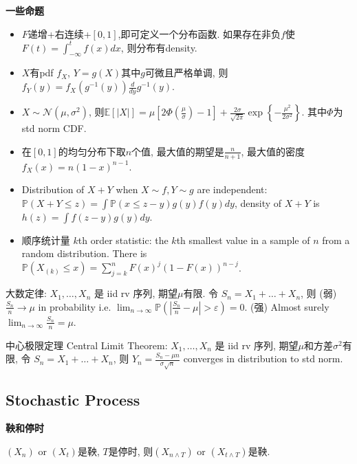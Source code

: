 \documentclass[UTF8]{ctexart}
\begin{document}
\noindent \textbf{一些命题}
\begin{itemize}

	\item $F$递增+右连续+$[0,1]$,即可定义一个分布函数.
	      如果存在非负$f$使$F(t)=\int_{-\infty}^t f(x)dx$, 则分布有density.

	\item $X$有pdf $f_X$, $Y=g(X)$其中$g$可微且严格单调, 则$f_Y(y)=f_X(g^{-1}(y))\frac{d}{dy}g^{-1}(y)$.

	\item $X\sim \mathcal{N}(\mu,\sigma^2)$,
	      则$\mathbb{E}[|X|]=\mu\left[2 \Phi\left(\frac{\mu}{\sigma}\right)-1\right]+
		      \frac{2 \sigma}{\sqrt{2 \pi}} \exp \left\{-\frac{\mu^{2}}{2 \sigma^{2}}\right\}$.
	      其中$\Phi$为std norm CDF.

	\item 在$[0,1]$的均匀分布下取$n$个值, 最大值的期望是$\frac{n}{n+1}$, 最大值的密度
	      $f_X(x) = n(1-x)^{n-1}$.

	\item Distribution of $X+Y$ when $X\sim f,Y\sim g$ are independent:
	      $\mathbb{P} (X+Y\leq z)=\int\mathbb{P}(x\leq z-y)g(y)f(y)dy$,
	      density of $X+Y$ is $h(z)=\int f(z-y)g(y)dy$.

	\item 顺序统计量 $k$th order statistic: the $k$th smallest value in a sample of $n$ from a random distribution.
	      There is $\mathbb{P}(X_{(k)}\leq x)=\sum_{j=k}^n F(x)^j (1-F(x))^{n-j}$.

\end{itemize}

大数定律:
$X_1,\dots,X_n$ 是 iid rv 序列, 期望$\mu$有限.
令 $S_n = X_1+\dots+X_n$, 则
(弱) $\frac{S_n}{n}\to\mu$ in probability i.e.
$\lim_{n\to\infty}\mathbb{P}(|\frac{S_n}{n}-\mu|>\varepsilon)=0$.
(强) Almost surely $\lim_{n\to\infty}\frac{S_n}{n}=\mu$.

中心极限定理 Central Limit Theorem:
$X_1,\dots,X_n$ 是 iid rv 序列, 期望$\mu$和方差$\sigma^2$有限,
令 $S_n = X_1+\dots+X_n$, 则 $Y_n=\frac{S_n-\mu n}{\sigma\sqrt{n}}$
converges in distribution to std norm.


\subsection{Stochastic Process}

\noindent \textbf{鞅和停时}

$(X_n)$ or $(X_t)$是鞅, $T$是停时, 则$(X_{n\wedge T})$ or $(X_{t\wedge T})$是鞅.
\end{document}
